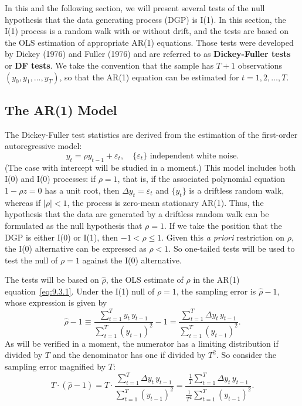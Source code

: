 
In this and the following section, we will present several tests of the null hypothesis
that the data generating process (DGP) is I(1). In this section, the I(1) process is a
random walk with or without drift, and the tests are based on the OLS estimation
of appropriate AR(1) equations. Those tests were developed by Dickey (1976) and
Fuller (1976) and are referred to as \textbf{Dickey-Fuller tests} or \textbf{DF tests}. We take the
convention that the sample has $T + 1$ observations $(y_0, y_1, \ldots, y_T)$, so that the
AR(1) equation can be estimated for $t = 1, 2, \ldots, T$.

\subsection*{The AR(1) Model}

The Dickey-Fuller test statistics are derived from the estimation of the first-order
autoregressive model:
\begin{equation}
\label{eq:9.3.1}
y_t = \rho y_{t-1} + \varepsilon_t, \quad \{\varepsilon_t\} \text{ independent white noise.}
\end{equation}
(The case with intercept will be studied in a moment.) This model includes both
I(0) and I(0) processes: if $\rho = 1$, that is, if the associated polynomial equation
$1 - \rho z = 0$ has a unit root, then $\Delta y_t = \varepsilon_t$ and $\{y_t\}$ is a driftless random walk,
whereas if $|\rho| < 1$, the process is zero-mean stationary AR(1). Thus, the hypothesis that the data are generated by a driftless random walk can be formulated as the
null hypothesis that $\rho = 1$. If we take the position that the DGP is either I(0) or
I(1), then $-1 < \rho \leq 1$. Given this \textit{a priori} restriction on $\rho$, the I(0) alternative can
be expressed as $\rho < 1$. So one-tailed tests will be used to test the null of $\rho = 1$
against the I(0) alternative.

The tests will be based on $\hat{\rho}$, the OLS estimate of $\rho$ in the AR(1) equation~\eqref{eq:9.3.1}. Under the I(1) null of $\rho = 1$, the sampling error is $\hat{\rho} - 1$, whose expression
is given by
\begin{equation}
\label{eq:9.3.2}
\hat{\rho} - 1 \equiv \frac{\sum_{t=1}^{T} y_t\, y_{t-1}}{\sum_{t=1}^{T} (y_{t-1})^2} - 1
= \frac{\sum_{t=1}^{T} \Delta y_t\, y_{t-1}}{\sum_{t=1}^{T} (y_{t-1})^2}.
\end{equation}
As will be verified in a moment, the numerator has a limiting distribution if divided
by $T$ and the denominator has one if divided by $T^2$. So consider the sampling error
magnified by $T$:
\begin{equation}
\label{eq:9.3.3}
T \cdot (\hat{\rho} - 1) = T \cdot \frac{\sum_{t=1}^{T} \Delta y_t\, y_{t-1}}{\sum_{t=1}^{T} (y_{t-1})^2}
= \frac{\frac{1}{T}\sum_{t=1}^{T} \Delta y_t\, y_{t-1}}{\frac{1}{T^2}\sum_{t=1}^{T} (y_{t-1})^2}.
\end{equation}

